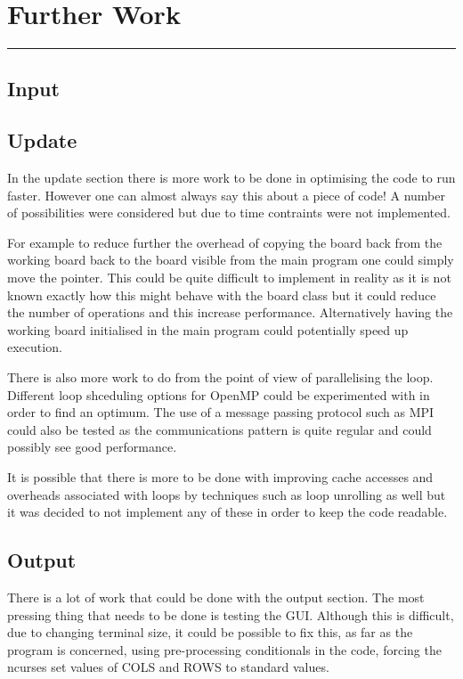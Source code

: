 \section{Further Work}
\vspace{-2em}\rule{\textwidth}{1pt}\vspace{-1em}
\subsection{Input}
\subsection{Update}
  In the update section there is more work to be done in optimising the code to run faster.
  However one can almost always say this about a piece of code!
  A number of possibilities were considered but due to time contraints were not implemented.

  For example to reduce further the overhead of copying the board back from the working board back to the board visible from the main program one could simply move the pointer.
  This could be quite difficult to implement in reality as it is not known exactly how this might behave with the board class but it could reduce the number of operations and this increase performance.
  Alternatively having the working board initialised in the main program could potentially speed up execution.

  There is also more work to do from the point of view of parallelising the loop.
  Different loop shceduling options for OpenMP could be experimented with in order to find an optimum.
  The use of a message passing protocol such as MPI could also be tested as the communications pattern is quite regular and could possibly see good performance.

  It is possible that there is more to be done with improving cache accesses and overheads associated with loops by techniques such as loop unrolling as well but it was decided to not implement any of these in order to keep the code readable.
\subsection{Output}
	There is a lot of work that could be done with the output section.
	The most pressing thing that needs to be done is testing the GUI.
	Although this is difficult, due to changing terminal size, it could be possible to fix this, as far as the program is concerned, using
	pre-processing conditionals in the code, forcing the ncurses set values of COLS and ROWS to standard values.
	
